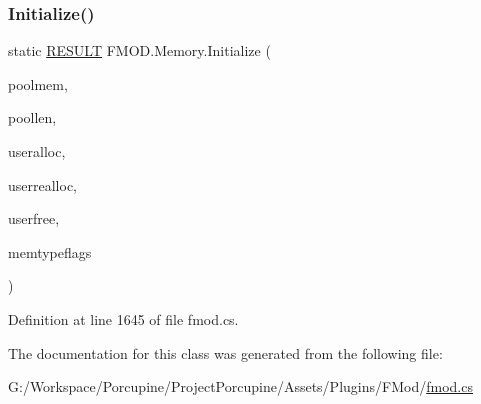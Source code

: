 \subsubsection{\texorpdfstring{Initialize()}{Initialize()}}
{\footnotesize\ttfamily static \hyperlink{namespace_f_m_o_d_a305d1176ef3f8c8815861a60407ac33d}{R\+E\+S\+U\+LT} F\+M\+O\+D.\+Memory.\+Initialize (\begin{DoxyParamCaption}\item[{Int\+Ptr}]{poolmem,  }\item[{int}]{poollen,  }\item[{\hyperlink{namespace_f_m_o_d_aff9ff44d1da401acbc19faf64e06a776}{M\+E\+M\+O\+R\+Y\+\_\+\+A\+L\+L\+O\+C\+\_\+\+C\+A\+L\+L\+B\+A\+CK}}]{useralloc,  }\item[{\hyperlink{namespace_f_m_o_d_a3d035f4158c569e31902d9ad59ab43f0}{M\+E\+M\+O\+R\+Y\+\_\+\+R\+E\+A\+L\+L\+O\+C\+\_\+\+C\+A\+L\+L\+B\+A\+CK}}]{userrealloc,  }\item[{\hyperlink{namespace_f_m_o_d_aa6d78ad454bb4b25659d9de9ca61fc42}{M\+E\+M\+O\+R\+Y\+\_\+\+F\+R\+E\+E\+\_\+\+C\+A\+L\+L\+B\+A\+CK}}]{userfree,  }\item[{\hyperlink{namespace_f_m_o_d_a3eb4c9654cbf371b668f8eb46358e931}{M\+E\+M\+O\+R\+Y\+\_\+\+T\+Y\+PE}}]{memtypeflags }\end{DoxyParamCaption})\hspace{0.3cm}{\ttfamily [static]}}



Definition at line 1645 of file fmod.\+cs.



The documentation for this class was generated from the following file\+:\begin{DoxyCompactItemize}
\item 
G\+:/\+Workspace/\+Porcupine/\+Project\+Porcupine/\+Assets/\+Plugins/\+F\+Mod/\hyperlink{fmod_8cs}{fmod.\+cs}\end{DoxyCompactItemize}
